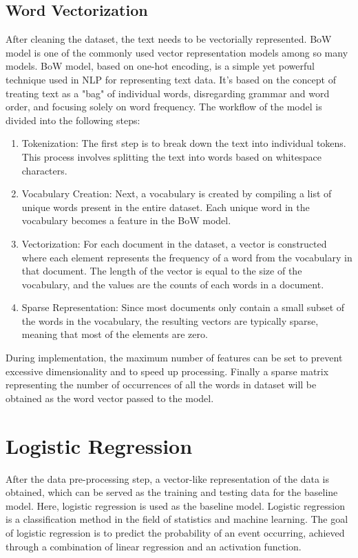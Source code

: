 \documentclass[ %
                    author={Bocheng Wang},
                supervisor={Dr. Qiang Liu},
                    degree={MSc},
                     title={A Research on Identification of Suicide Ideation in Texts with Multiple Models},
                      type={},
                      year={2024}]{dissertation}
\begin{document}
\subsection{Word Vectorization}
\noindent
After cleaning the dataset, the text needs to be vectorially represented. BoW model is one of the commonly used vector representation models among so many models. BoW model, based on one-hot encoding\cite{chren1998one}, is a simple yet powerful technique used in NLP for representing text data. It's based on the concept of treating text as a "bag" of individual words, disregarding grammar and word order, and focusing solely on word frequency. The workflow of the model is divided into the following steps:

\begin{enumerate}
      \item Tokenization: The first step is to break down the text into individual tokens. This process involves splitting the text into words based on whitespace characters.
      \item Vocabulary Creation: Next, a vocabulary is created by compiling a list of unique words present in the entire dataset. Each unique word in the vocabulary becomes a feature in the BoW model.
      \item Vectorization: For each document in the dataset, a vector is constructed where each element represents the frequency of a word from the vocabulary in that document. The length of the vector is equal to the size of the vocabulary, and the values are the counts of each words in a document.
      \item Sparse Representation: Since most documents only contain a small subset of the words in the vocabulary, the resulting vectors are typically sparse, meaning that most of the elements are zero.
\end{enumerate}

During implementation, the maximum number of features can be set to prevent excessive dimensionality and to speed up processing. Finally a sparse matrix representing the number of occurrences of all the words in dataset will be obtained as the word vector passed to the model.

\section{Logistic Regression}
\noindent
After the data pre-processing step, a vector-like representation of the data is obtained, which can be served as the training and testing data for the baseline model. Here, logistic regression is used as the baseline model. Logistic regression is a classification method in the field of statistics and machine learning. The goal of logistic regression is to predict the probability of an event occurring, achieved through a combination of linear regression and an activation function.
\end{document}
